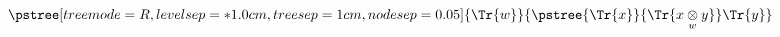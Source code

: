 \vspace{0.5cm}
$\displaystyle
\pstree[treemode=R,levelsep=*1.0cm,treesep=1cm,nodesep=0.05]
{
	\Tr{w}
}
{
   \pstree
	{
	   \Tr{x}
	}
	{
		\Tr{\crossx{x}{y}{w}\nudgeup{0.5cm}} 
	}
	\Tr{y}
}
$